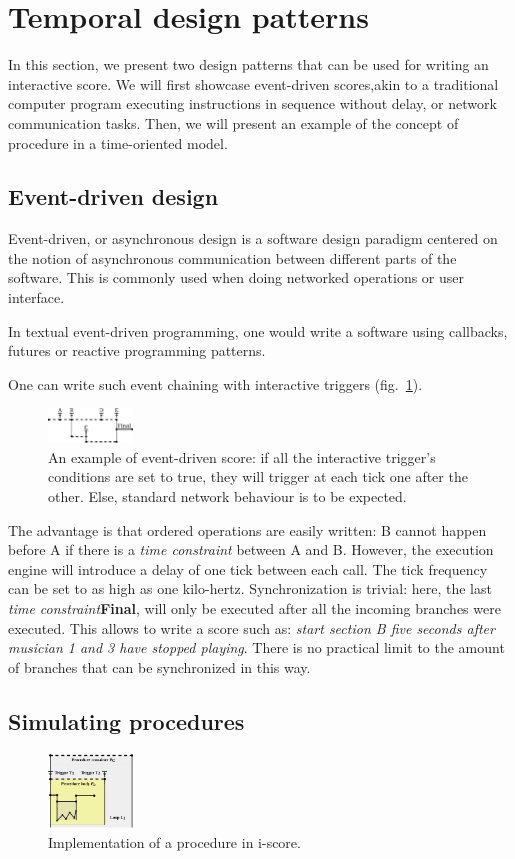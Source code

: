 \documentclass{article}
\newcommand{\timeconstraint}{\textit{time constraint}\xspace}
\begin{document}
\section{Temporal design patterns}
In this section, we present two design patterns that can be used 
for writing an interactive score.
We will first showcase event-driven scores,akin to a traditional computer program executing instructions in sequence without delay, or network communication tasks.
Then, we will present an example of the concept of procedure in a time-oriented model.
\subsection{Event-driven design}
Event-driven, or asynchronous design is a software design 
paradigm centered on the notion of asynchronous 
communication between different parts of the software.
This is commonly used when doing networked operations or 
user interface.

In textual event-driven programming, one would write a software 
using callbacks, futures or reactive programming patterns\cite{kambona2013evaluation}. 

One can write such event chaining with interactive triggers (fig.~\ref{fig.event}).
 
\begin{figure}[h]
	\centering
	\includegraphics[width=0.20\textwidth]{images/event.eps}
	\caption{An example of event-driven score: if all the interactive trigger's conditions are set to true, they will trigger at each tick one after the other. Else, standard network behaviour is to be expected.}
	\label{fig.event}
\end{figure}
The advantage is that ordered operations are easily written: B cannot happen before A if there is a \timeconstraint between A and B.
However, the execution engine will introduce a delay of one tick between each call.
The tick frequency can be set to as high as one kilo-hertz.
Synchronization is trivial: here, the last \timeconstraint \textbf{Final}, will 
only be executed after all the incoming branches were executed. 
This allows to write a score such as: \emph{start section B five seconds after musician 1 and 3 
have stopped playing}.
There is no practical limit to the amount of branches that can be synchronized in this way.
\subsection{Simulating procedures}
\vspace{-3mm}
\begin{figure}[h]
\centering
\includegraphics[width=0.20\textwidth]{images/function.eps}
\caption{Implementation of a procedure in i-score.}
\label{fig.function}
\end{figure}
\end{document}
